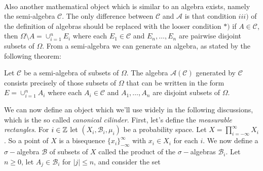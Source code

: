 \\Also another mathematical object which is similar to an algebra exists, namely the semi-algebra $\mathscr{C}$. The only difference between $\mathscr{C}$ and $\mathscr{A}$ is that condition $iii)$ of the definition of algebras should be replaced with the looser condition $*)$ if $A \in \mathscr{C}$, then $\Omega \setminus A = \cup_{i=1}^{n} E_i$ where each $E_1 \in \mathscr{C}$ and $E_n, \dots, E_n$ are pairwise disjoint subsets of $\Omega$. From a semi-algebra we can generate an algebra, as stated by the following theorem:
\begin{theorem}
    Let $\mathscr{C}$ be a semi-algebra of subsets of $\Omega$. The algebra $\mathscr{A}(\mathscr{C})$ generated by $\mathscr{C}$ consists precisely of those subsets of $\Omega$ that can be written in the form $E= \cup_{i=1}^{n} A_i$ where each $A_i \in \mathscr{C}$ and $A_1, \dots, A_n$ are disjoint subsets of $\Omega$.
\end{theorem}
We can now define an object which we'll use widely in the following discussions, which is the so called \textit{canonical cilinder}. First, let's define the \textit{measurable rectangles}. For $i \in \mathbb{Z}$ let $(X_i, \mathscr{B}_i, \mu_i)$ be a probability space. Let $X = \prod_{i = -\infty}^{\infty} X_i$. So a point of $X$ is a bisequence $\{x_i\}_{-\infty}^{\infty}$ with $x_i \in X_i$ for each $i$. We now define a $\sigma-$algebra $\mathscr{B}$ of subsets of $X$ called the product of the $\sigma-$algebras $\mathscr{B}_i$. Let $n \geq 0$, let $A_j \in \mathscr{B}_i$ for $|j| \leq n$, and consider the set 

